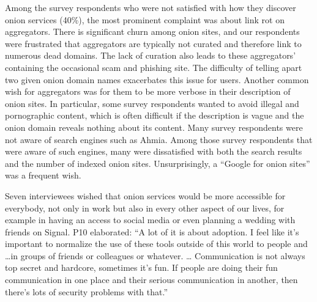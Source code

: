 Among the survey respondents who were not satisfied with how they discover onion
services (40\%), the most prominent complaint was about link rot on aggregators.
There is significant churn among onion sites, and our respondents were
frustrated that aggregators are typically not curated and therefore link to
numerous dead domains.  The lack of curation also leads to these aggregators'
containing the occasional scam and phishing site.  The difficulty of telling
apart two given onion domain names exacerbates this issue for users.  Another
common wish for aggregators was for them to be more verbose in their description
of onion sites.  In particular, some survey respondents wanted to avoid illegal
and pornographic content, which is often difficult if the description is vague
and the onion domain reveals nothing about its content.  Many survey respondents
were not aware of search engines such as Ahmia.  Among those survey respondents
that were aware of such engines, many were dissatisfied with both the search
results and the number of indexed onion sites.  Unsurprisingly, a ``Google for
onion sites'' was a frequent wish.

Seven interviewees wished that onion services would be more accessible for
everybody, not only in work but also in every other aspect of our lives, for
example in having an access to social media or even planning a wedding with
friends on Signal.  P10 elaborated: ``A lot of it is about adoption.  I feel
like it's important to normalize the use of these tools outside of this world to
people and \ldots in groups of friends or colleagues or whatever.  \ldots
Communication is not always top secret and hardcore, sometimes it's fun.  If
people are doing their fun communication in one place and their serious
communication in another, then there's lots of security problems with that.''

